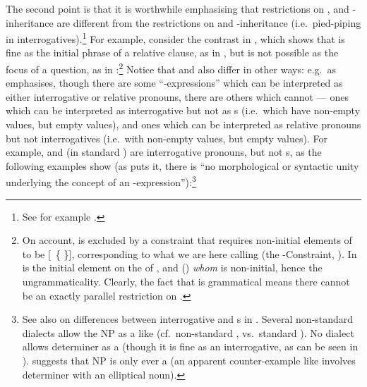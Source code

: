 \documentclass[output=paper,biblatex,babelshorthands,newtxmath,draftmode,colorlinks,citecolor=brown]{langscibook}
\begin{document}
The second point is that it is worthwhile emphasising that restrictions on , and
-inheritance are different from the restrictions on  and
-inheritance (i.e.\ pied-piping in interrogatives).\footnote{See for example
  .} For example, consider the contrast in ,
which shows that  is fine as the initial phrase of a relative
clause, as in , but is not possible as the focus of a question, as in
:\footnote{On  account,  is excluded
  by a constraint that requires non-initial elements of  to be
  [~\{ \}],  corresponding to what we are here calling  (the
  -Constraint, \citealt[189]{Ginzburg:Sag:00}). In   is
  the initial element on the  of ,
and () \emph{whom} is
  non-initial, hence the ungrammaticality. Clearly, the fact that  is
  grammatical means there cannot be an exactly parallel
  restriction on .}
\eal\label{x:rc-2930}
\zl
Notice that  and  also differ in other ways: e.g.\ as
\citet[490--493]{Sag:10b} emphasises, though there are some ``-expressions'' which
can be interpreted as either interrogative or relative pronouns, there are others which
cannot --- ones which can be interpreted as interrogative but not as s (i.e.\ which have non-empty  values, but empty  values),
and ones which can be interpreted as relative pronouns but not interrogatives (i.e.\ with
non-empty  values, but empty  values). For example,  and (in
standard )  are interrogative pronouns, but not s, as the following examples show (as \citealt[493]{Sag:10b} puts it, there is
``no morphological or syntactic unity underlying the concept of an 
-expression''):\footnote{See also  on differences between
  interrogative and s in . Several non-standard
   dialects allow the NP  as a  like 
  (cf.\ non-standard , vs.\ standard ). No dialect allows determiner  as a 
  (though it is fine as an interrogative, as can be seen in ). \citet[491,
  note 10]{Sag:10b} suggests that NP  is only ever a  (an
  apparent counter-example like   involves determiner 
  with an elliptical noun).}
\end{document}
